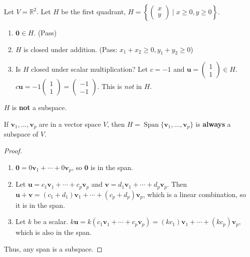 \documentclass[oneside]{book}
\begin{document}
\begin{example}
Let $V = \mathbb{R}^2$. Let $H$ be the first quadrant, $H = \left\{ \begin{pmatrix} x \\ y \end{pmatrix} \mid x \ge 0, y \ge 0 \right\}$.
\begin{enumerate}
    \item $\mathbf{0} \in H$. (Pass)
    \item $H$ is closed under addition. (Pass: $x_1+x_2 \ge 0, y_1+y_2 \ge 0$)
    \item Is $H$ closed under scalar multiplication? Let $c = -1$ and $\mathbf{u} = \begin{pmatrix} 1 \\ 1 \end{pmatrix} \in H$.
    $c\mathbf{u} = -1 \begin{pmatrix} 1 \\ 1 \end{pmatrix} = \begin{pmatrix} -1 \\ -1 \end{pmatrix}$. This is \emph{not} in $H$.
\end{enumerate}
$H$ is \textbf{not} a subspace.
\end{example}

\begin{theorem}
If $\mathbf{v}_1, \ldots, \mathbf{v}_p$ are in a vector space $V$, then $H = \operatorname{Span}\{\mathbf{v}_1, \ldots, \mathbf{v}_p\}$ is \textbf{always} a subspace of $V$.
\end{theorem}
\begin{proof}
\begin{enumerate}
    \item $\mathbf{0} = 0\mathbf{v}_1 + \cdots + 0\mathbf{v}_p$, so $\mathbf{0}$ is in the span.
    \item Let $\mathbf{u} = c_1\mathbf{v}_1 + \cdots + c_p\mathbf{v}_p$ and $\mathbf{v} = d_1\mathbf{v}_1 + \cdots + d_p\mathbf{v}_p$.
    Then $\mathbf{u} + \mathbf{v} = (c_1+d_1)\mathbf{v}_1 + \cdots + (c_p+d_p)\mathbf{v}_p$, which is a linear combination, so it is in the span.
    \item Let $k$ be a scalar. $k\mathbf{u} = k(c_1\mathbf{v}_1 + \cdots + c_p\mathbf{v}_p) = (kc_1)\mathbf{v}_1 + \cdots + (kc_p)\mathbf{v}_p$, which is also in the span.
\end{enumerate}
Thus, any span is a subspace.
\end{proof}
\end{document}
